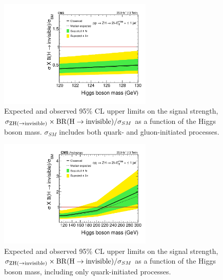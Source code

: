  \begin{figure}[hbtp]
   \begin{center}
     \includegraphics[width=0.65\textwidth]{figures/ana_hzinv_met_nj_massscan_from120to130_logx0_logy0.pdf}
     \caption{
       Expected and observed 95\% CL upper limits on the signal strength, 
       $\sigma_{\mathrm{Z}\mathrm{H}(\to \rm invisible)} \times \mathrm{BR}(\mathrm{H} \to {\rm invisible})/\sigma_{SM}$ as a function of the Higgs boson mass.
       $\sigma_{SM}$ includes both quark- and gluon-initiated processes.
     }
     \label{fig:xsLim_qqgg}
   \end{center}
 \end{figure}

 \begin{figure}[hbtp]
   \begin{center}
     \includegraphics[width=0.65\textwidth]{figures/ana_hzinv_met_nj_ratios_from110to300_logx0_logy0.pdf}
     \caption{
       Expected and observed 95\% CL upper limits on the signal strength, 
       $\sigma_{\mathrm{Z}\mathrm{H}(\to \rm invisible)} \times \mathrm{BR}(\mathrm{H} \to {\rm invisible})/\sigma_{SM}$ as a function of the Higgs boson mass,
       including only quark-initiated processes.
     }
     \label{fig:xsLim_qq}
   \end{center}
 \end{figure}

